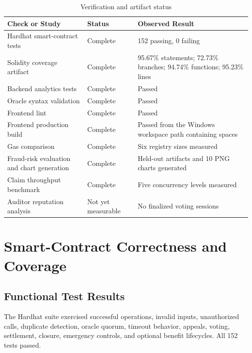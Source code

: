 \begin{table}[htbp]
\centering
\caption{Verification and artifact status}
\label{tab:verification_status}
\begin{tabular}{|p{6.0cm}|p{3.2cm}|p{4.4cm}|}
\hline
\textbf{Check or Study} & \textbf{Status} & \textbf{Observed Result} \\
\hline
Hardhat smart-contract tests & Complete & 152 passing, 0 failing \\
\hline
Solidity coverage artifact & Complete & 95.67\% statements; 72.73\% branches;
94.74\% functions; 95.23\% lines \\
\hline
Backend analytics tests & Complete & Passed \\
\hline
Oracle syntax validation & Complete & Passed \\
\hline
Frontend lint & Complete & Passed \\
\hline
Frontend production build & Complete & Passed from the Windows workspace path
containing spaces \\
\hline
Gas comparison & Complete & Six registry sizes measured \\
\hline
Fraud-risk evaluation and chart generation & Complete & Held-out artifacts and
10 PNG charts generated \\
\hline
Claim throughput benchmark & Complete & Five concurrency levels measured \\
\hline
Auditor reputation analysis & Not yet measurable & No finalized voting
sessions \\
\hline
\end{tabular}
\end{table}

\section{Smart-Contract Correctness and Coverage}
\label{sec:contract_results}

\subsection{Functional Test Results}

The Hardhat suite exercised successful operations, invalid inputs, unauthorized
calls, duplicate detection, oracle quorum, timeout behavior, appeals, voting,
settlement, closure, emergency controls, and optional benefit lifecycles. All
152 tests passed.


